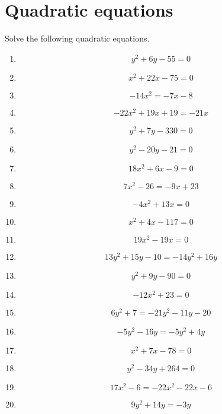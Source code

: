 \documentclass{article}
\begin{document}
        \section{Quadratic equations}
        Solve the following quadratic equations.
        \begin{multicols}{1}
        \begin{enumerate}
        \item $$y^{2} + 6 y - 55 = 0$$
\item $$x^{2} + 22 x - 75 = 0$$
\item $$- 14 x^{2} = - 7 x - 8$$
\item $$- 22 x^{2} + 19 x + 19 = - 21 x$$
\item $$y^{2} + 7 y - 330 = 0$$
\item $$y^{2} - 20 y - 21 = 0$$
\item $$18 x^{2} + 6 x - 9 = 0$$
\item $$7 x^{2} - 26 = - 9 x + 23$$
\item $$- 4 x^{2} + 13 x = 0$$
\item $$x^{2} + 4 x - 117 = 0$$
\item $$19 x^{2} - 19 x = 0$$
\item $$13 y^{2} + 15 y - 10 = - 14 y^{2} + 16 y$$
\item $$y^{2} + 9 y - 90 = 0$$
\item $$- 12 x^{2} + 23 = 0$$
\item $$6 y^{2} + 7 = - 21 y^{2} - 11 y - 20$$
\item $$- 5 y^{2} - 16 y = - 5 y^{2} + 4 y$$
\item $$x^{2} + 7 x - 78 = 0$$
\item $$y^{2} - 34 y + 264 = 0$$
\item $$17 x^{2} - 6 = - 22 x^{2} - 22 x - 6$$
\item $$9 y^{2} + 14 y = - 3 y$$
        \end{enumerate}
        \end{multicols}
        
\end{document}

